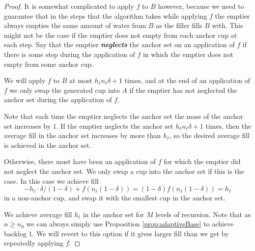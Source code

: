 \documentclass[twocolumn]{article}[11pt]
\newcommand{\defn}[1]{{\textit{\textbf{\boldmath #1}}}}
\begin{document}
\begin{proof}
  It is somewhat complicated to apply $f$ to $B$ however, because we need to
  guarantee that in the steps that the algorithm takes while applying $f$ the
  emptier always empties the same amount of water from $B$ as the filler fills
  $B$ with. This might not be the case if the emptier does not empty from each
  anchor cup at each step. Say that the emptier \defn{neglects} the anchor set
  on an application of $f$ if there is some step during the application of $f$
  in which the emptier does not empty from some anchor cup.

  We will apply $f$ to $B$ at most $h_\ell n_\ell\delta + 1$ times, and at the
  end of an application of $f$ we only swap the generated cup into $A$ if the
  emptier has not neglected the anchor set during the application of $f$.

  Note that each time the emptier neglects the anchor set the mass of the
  anchor set increases by $1$. If the emptier neglects the anchor set $h_\ell
  n_\ell\delta + 1$ times, then the average fill in the anchor set increases by
  more than $h_\ell$, so the desired average fill is achieved in the anchor set.

  Otherwise, there must have been an application of $f$ for which the emptier
  did not neglect the anchor set. We only swap a cup into the anchor set if
  this is the case. In this case we achieve fill 
  $$-h_\ell \cdot \delta/(1-\delta) + f(n_\ell (1-\delta)) = (1-\delta)f(n_\ell
  (1-\delta)) = h_\ell$$
  in a non-anchor cup, and swap it with the smallest cup in the anchor set.

  We achieve average fill $h_\ell$ in the anchor set for $M$ levels of
  recursion. Note that as $n\ge n_0$ we can always simply use Proposition
  \ref{prop:adaptiveBase} to achieve backlog $1$. We will revert to this option
  if it gives larger fill than we get by repeatedly applying $f$.
\end{proof}
\end{document}
